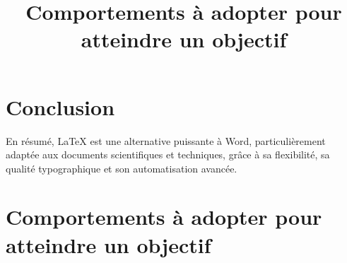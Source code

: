 \documentclass[a4paper,12pt]{article} %
\begin{document}
\section{Conclusion} %
En résumé, \LaTeX{} est une alternative puissante à Word, 
particulièrement adaptée aux documents scientifiques et techniques, 
grâce à sa flexibilité, sa qualité typographique et son automatisation avancée.



\title{Comportements à adopter pour atteindre un objectif}  %
\maketitle  %

\section{Comportements à adopter pour atteindre un objectif}
\end{document}
